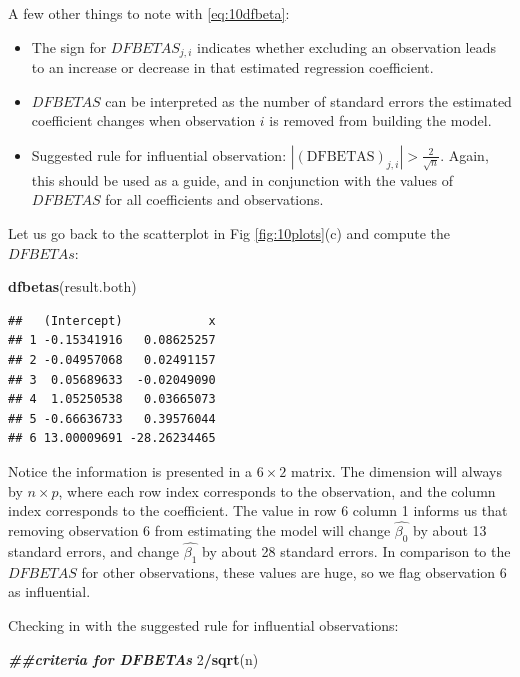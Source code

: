 \documentclass[
]{book}
\newenvironment{Shaded}{\begin{snugshade}}{\end{snugshade}}
\newcommand{\DecValTok}[1]{\textcolor[rgb]{0.00,0.00,0.81}{#1}}
\newcommand{\DocumentationTok}[1]{\textcolor[rgb]{0.56,0.35,0.01}{\textbf{\textit{#1}}}}
\newcommand{\FunctionTok}[1]{\textcolor[rgb]{0.13,0.29,0.53}{\textbf{#1}}}
\newcommand{\NormalTok}[1]{#1}
\newcommand{\SpecialCharTok}[1]{\textcolor[rgb]{0.81,0.36,0.00}{\textbf{#1}}}
\providecommand{\tightlist}{%
  \setlength{\itemsep}{0pt}\setlength{\parskip}{0pt}}
\begin{document}
A few other things to note with \eqref{eq:10dfbeta}:

\begin{itemize}
\tightlist
\item
  The sign for \(DFBETAS_{j,i}\) indicates whether excluding an observation leads to an increase or decrease in that estimated regression coefficient.
\item
  \(DFBETAS\) can be interpreted as the number of standard errors the estimated coefficient changes when observation \(i\) is removed from building the model.
\item
  Suggested rule for influential observation: \(|(\mbox{DFBETAS})_{j,i}|>\frac{2}{\sqrt{n}}\). Again, this should be used as a guide, and in conjunction with the values of \(DFBETAS\) for all coefficients and observations.
\end{itemize}

Let us go back to the scatterplot in Fig \ref{fig:10plots}(c) and compute the \(DFBETAs\):

\begin{Shaded}
\begin{Highlighting}[]
\FunctionTok{dfbetas}\NormalTok{(result.both)}
\end{Highlighting}
\end{Shaded}

\begin{verbatim}
##   (Intercept)            x
## 1 -0.15341916   0.08625257
## 2 -0.04957068   0.02491157
## 3  0.05689633  -0.02049090
## 4  1.05250538   0.03665073
## 5 -0.66636733   0.39576044
## 6 13.00009691 -28.26234465
\end{verbatim}

Notice the information is presented in a \(6 \times 2\) matrix. The dimension will always by \(n \times p\), where each row index corresponds to the observation, and the column index corresponds to the coefficient. The value in row 6 column 1 informs us that removing observation 6 from estimating the model will change \(\hat{\beta_0}\) by about 13 standard errors, and change \(\hat{\beta_1}\) by about 28 standard errors. In comparison to the \(DFBETAS\) for other observations, these values are huge, so we flag observation 6 as influential.

Checking in with the suggested rule for influential observations:

\begin{Shaded}
\begin{Highlighting}[]
\DocumentationTok{\#\#criteria for DFBETAs}
\DecValTok{2}\SpecialCharTok{/}\FunctionTok{sqrt}\NormalTok{(n)}
\end{Highlighting}
\end{Shaded}
\end{document}

